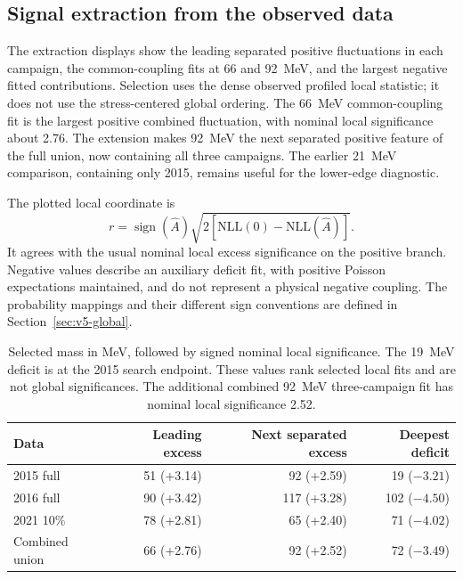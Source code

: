 \FloatBarrier\clearpage
\subsection{Signal extraction from the observed data}
\label{sec:extractions}\label{sec:v5-extractions}

The extraction displays show the leading separated positive fluctuations in
each campaign, the common-coupling fits at 66 and 92~MeV, and the largest
negative fitted contributions. Selection uses the dense observed profiled
local statistic; it does not use the stress-centered global ordering. The
66~MeV common-coupling fit is the largest positive combined fluctuation,
with nominal local significance about 2.76. The extension makes 92~MeV the next separated positive feature of the
full union, now containing all three campaigns. The earlier 21~MeV
comparison, containing only 2015, remains useful for the lower-edge diagnostic.

The plotted local coordinate is
\begin{equation}
 r=\operatorname{sign}(\widehat A)
 \sqrt{2[\mathrm{NLL}(0)-\mathrm{NLL}(\widehat A)]}.
\end{equation}
It agrees with the usual nominal local excess significance on the positive
branch. Negative values describe an auxiliary deficit fit, with positive
Poisson expectations maintained, and do not represent a physical negative
coupling. The probability mappings and their different sign conventions
are defined in Section~\ref{sec:v5-global}.

\begin{table}[htbp]\centering\small
\begin{tabular}{lrrr}\toprule
Data & Leading excess & Next separated excess & Deepest deficit\\\midrule
2015 full & 51 (+3.14) & 92 (+2.59) & 19 ($-3.21$)\\
2016 full & 90 (+3.42) & 117 (+3.28) & 102 ($-4.50$)\\
2021 10\% & 78 (+2.81) & 65 (+2.40) & 71 ($-4.02$)\\
Combined union & 66 (+2.76) & 92 (+2.52) & 72 ($-3.49$)\\\bottomrule
\end{tabular}
\caption{Selected mass in MeV, followed by signed nominal local significance.
The 19~MeV deficit is at the 2015 search endpoint. These values rank selected
local fits and are not global significances. The additional combined
92~MeV three-campaign fit has nominal local significance 2.52.}
\end{table}

